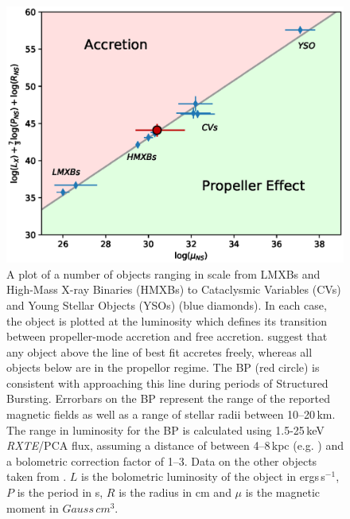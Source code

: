 \begin{figure}
 \centering
 \includegraphics[width=.82\linewidth, trim={0.6cm 0.1cm 1.0cm 1.1cm},clip]{images/propeff.eps}
 \caption[A plot of a number of objects ranging in scale from LMXBs and High-Mass X-ray Binaries (HMXBs) to Cataclysmic Variables (CVs) and Young Stellar Objects (YSOs). In each case, the object is plotted at the luminosity which defines its transition between propeller-mode accretion and free accretion.]{A plot of a number of objects ranging in scale from LMXBs and High-Mass X-ray Binaries (HMXBs) to Cataclysmic Variables (CVs) and Young Stellar Objects (YSOs) (blue diamonds). In each case, the object is plotted at the luminosity which defines its transition between propeller-mode accretion and free accretion. \citealp{Campana_PropBorder} suggest that any object above the line of best fit accretes freely, whereas all objects below are in the propellor regime. The BP (red circle) is consistent with approaching this line during periods of Structured Bursting. Errorbars on the BP represent the range of the reported magnetic fields as well as a range of stellar radii between 10--20\,km. The range in luminosity for the BP is calculated using 1.5-25\,keV \textit{RXTE}/PCA flux, assuming a distance of between 4--8\,kpc (e.g. \citealp{Kouveliotou_BP,Gosling_BPCompanion,Sanna_BP}) and a bolometric correction factor of 1--3.  Data on the other objects taken from \citealp{Campana_PropBorder}. $L$ is the bolometric luminosity of the object in ergs\,s$^{-1}$, $P$ is the period in s, $R$ is the radius in cm and $\mu$ is the magnetic moment in $Gauss\,cm^3$.}
 \label{fig:propBorder}
\end{figure}

